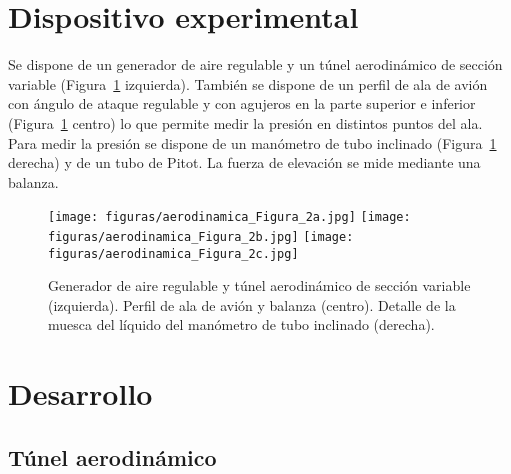 \documentclass[11pt]{articulo}
\begin{document}
\section{Dispositivo experimental}

Se dispone de un generador de aire regulable y un t\'unel aerodin\'amico de secci\'on variable (Figura~\ref{dispositivo} izquierda). Tambi\'en se dispone de un perfil de ala de avi\'on con \'angulo de ataque regulable y con agujeros en la parte superior e inferior (Figura~\ref{dispositivo} centro) lo que permite medir la presi\'on en distintos puntos del ala. Para medir la presi\'on se dispone de un man\'ometro de tubo inclinado (Figura~\ref{dispositivo} derecha) y de un tubo de Pitot. La fuerza de elevaci\'on se mide mediante una balanza.
%
\begin{figure}[htb]
\begin{center}
\hspace*{0.0cm}
\texttt{[image: figuras/aerodinamica\_Figura\_2a.jpg]}
\texttt{[image: figuras/aerodinamica\_Figura\_2b.jpg]}
\texttt{[image: figuras/aerodinamica\_Figura\_2c.jpg]}
\end{center}
\vspace*{-0.6cm}
\caption[]{\label{dispositivo}{Generador de aire regulable y t\'unel aerodin\'amico de secci\'on variable (izquierda). Perfil de ala de avi\'on y balanza (centro). Detalle de la muesca del l\'iquido del man\'ometro de tubo inclinado (derecha).}}
\end{figure}


\section{Desarrollo}

\subsection{T\'unel aerodin\'amico}
\end{document}
